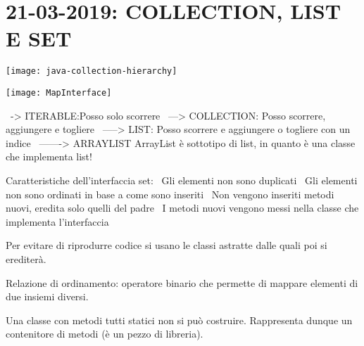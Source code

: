 

\newpage
\section{21-03-2019: COLLECTION, LIST E SET}
\begin{center}
\texttt{[image: java-collection-hierarchy]}
\end{center} 

\begin{center}
\texttt{[image: MapInterface]}
\end{center} 
\textbullet\ -> ITERABLE:Posso solo scorrere \newline
\textbullet\ ---> COLLECTION: Posso scorrere, aggiungere e togliere \newline
\textbullet\ -----> LIST: Posso scorrere e aggiungere o togliere con un indice \newline
\textbullet\ -------> ARRAYLIST \newline
ArrayList è sottotipo di list, in quanto è una classe che implementa list! \newline
{} \newline

\noindent Caratteristiche dell'interfaccia set:\newline
\textbullet\ Gli elementi non sono duplicati \newline
\textbullet\ Gli elementi non sono ordinati in base a come sono inseriti \newline	
\textbullet\ Non vengono inseriti metodi nuovi, eredita solo quelli del padre \newline
\textbullet\ I metodi nuovi vengono messi nella classe che implementa l'interfaccia \newline

\noindent Per evitare di riprodurre codice si usano le classi astratte dalle quali poi si erediterà. 

\noindent Relazione di ordinamento: operatore binario che permette di mappare elementi di due insiemi diversi.

\noindent Una classe con metodi tutti statici non si può costruire. Rappresenta dunque un contenitore di metodi (è un pezzo di libreria).

